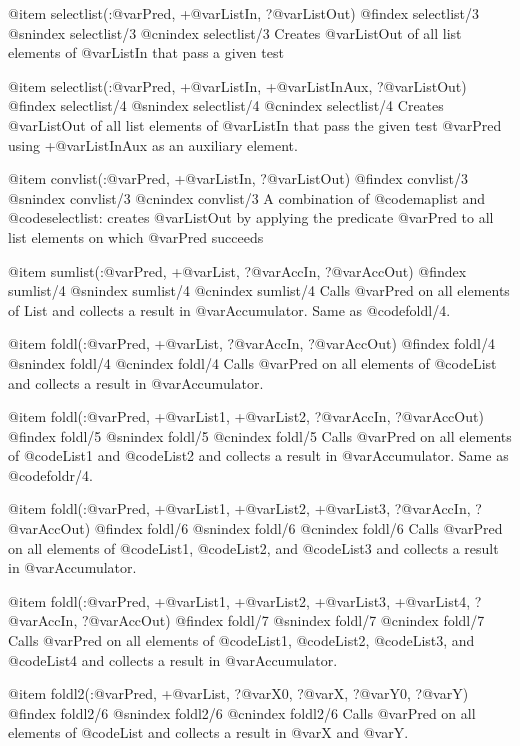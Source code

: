 @item selectlist(:@var{Pred}, +@var{ListIn}, ?@var{ListOut})
@findex selectlist/3
@snindex selectlist/3
@cnindex selectlist/3
      Creates @var{ListOut} of all list elements of @var{ListIn} that pass a given test

@item selectlist(:@var{Pred}, +@var{ListIn}, +@var{ListInAux}, ?@var{ListOut})
@findex selectlist/4
@snindex selectlist/4
@cnindex selectlist/4
      Creates @var{ListOut} of all list elements of @var{ListIn} that
      pass the given test @var{Pred} using +@var{ListInAux} as an
      auxiliary element.

@item convlist(:@var{Pred}, +@var{ListIn}, ?@var{ListOut})
@findex convlist/3
@snindex convlist/3
@cnindex convlist/3
      A combination of @code{maplist} and @code{selectlist}: creates @var{ListOut} by
applying the predicate @var{Pred} to all list elements on which
@var{Pred} succeeds

@item sumlist(:@var{Pred}, +@var{List}, ?@var{AccIn}, ?@var{AccOut})
@findex sumlist/4
@snindex sumlist/4
@cnindex sumlist/4
      Calls @var{Pred} on all elements of List and collects a result in
@var{Accumulator}. Same as @code{foldl/4}.

@item foldl(:@var{Pred}, +@var{List}, ?@var{AccIn}, ?@var{AccOut})
@findex foldl/4
@snindex foldl/4
@cnindex foldl/4
      Calls @var{Pred} on all elements of @code{List} and collects a result in
@var{Accumulator}.

@item foldl(:@var{Pred}, +@var{List1}, +@var{List2}, ?@var{AccIn}, ?@var{AccOut})
@findex foldl/5
@snindex foldl/5
@cnindex foldl/5
      Calls @var{Pred} on all elements of @code{List1} and
@code{List2} and collects a result in @var{Accumulator}. Same as
@code{foldr/4}.

@item foldl(:@var{Pred}, +@var{List1}, +@var{List2}, +@var{List3}, ?@var{AccIn}, ?@var{AccOut})
@findex foldl/6
@snindex foldl/6
@cnindex foldl/6
      Calls @var{Pred} on all elements of @code{List1}, @code{List2}, and
@code{List3} and collects a result in @var{Accumulator}.

@item foldl(:@var{Pred}, +@var{List1}, +@var{List2}, +@var{List3}, +@var{List4}, ?@var{AccIn}, ?@var{AccOut})
@findex foldl/7
@snindex foldl/7
@cnindex foldl/7
      Calls @var{Pred} on all elements of @code{List1}, @code{List2}, @code{List3}, and
@code{List4} and collects a result in @var{Accumulator}.

@item foldl2(:@var{Pred}, +@var{List}, ?@var{X0}, ?@var{X}, ?@var{Y0}, ?@var{Y})
@findex foldl2/6
@snindex foldl2/6
@cnindex foldl2/6
      Calls @var{Pred} on all elements of @code{List} and collects a result in
@var{X} and @var{Y}.

